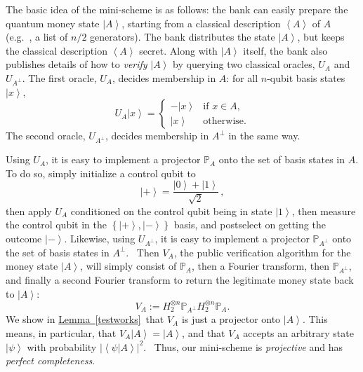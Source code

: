\documentclass[10pt]{article}
\theoremstyle{definition}
\providecommand{\eg}{e.g.\ }
\numberwithin{equation}{section}
\newcommand{\expref}[2]{\texorpdfstring{\hyperref[#2]{#1~\ref{#2}}}{#1~\ref{#2}}}
\begin{document}
The basic idea of the mini-scheme is as follows: the bank can easily prepare
the quantum money state $\left\vert A\right\rangle $, starting from a
classical description $\left\langle A\right\rangle $ of $A$ (\eg, a list of
$n/2$ generators). The bank distributes the state $\left\vert
A\right\rangle $, but keeps the classical description $\left\langle
A\right\rangle $ secret. Along with $\left\vert A\right\rangle $ itself,
the bank also publishes details of how to \emph{verify} $\left\vert
A\right\rangle $ by querying two classical oracles, $U_{A}$ and $U_{A^{\bot}%
}$. The first oracle, $U_{A}$, decides membership in $A$: for all $n$-qubit
basis states $\left\vert x\right\rangle $,%
\[
U_{A}\left\vert x\right\rangle =
\begin{cases}
-\left\vert x\right\rangle  & \text{if $x\in A$,}\\
\left\vert x\right\rangle  & \text{otherwise.}%
\end{cases}
\]
The second oracle, $U_{A^{\bot}}$, decides membership in $A^{\bot}$ in the
same way.

Using $U_{A}$, it is easy to implement a projector $\mathbb{P}_{A}$ onto the
set of basis states in $A$. To do so, simply initialize a control qubit to
\[
\left\vert +\right\rangle =\frac{\left\vert 0\right\rangle +\left\vert
1\right\rangle }{\sqrt{2}}\,,
\]
then apply $U_{A}$ conditioned on the control
qubit being in state $\left\vert 1\right\rangle $, then measure the control
qubit in the $\left\{  \left\vert +\right\rangle ,\left\vert -\right\rangle
\right\}  $ basis, and postselect on getting the outcome $\left\vert
-\right\rangle $. Likewise, using $U_{A^{\bot}}$, it is easy to implement a
projector $\mathbb{P}_{A^{\bot}}$ onto the set of basis states in $A^{\bot}$.
\ Then $V_{A}$, the public verification algorithm for the money state
$\left\vert A\right\rangle $, will simply consist of $\mathbb{P}_{A}$, then a
Fourier transform, then $\mathbb{P}_{A^{\bot}}$, and finally a second Fourier
transform to return the legitimate money state back to $\left\vert
A\right\rangle $:%
\[
V_{A}:=H_{2}^{\otimes n}\mathbb{P}_{A^{\bot}}H_{2}^{\otimes n}\mathbb{P}_{A}.
\]
We show in \expref{Lemma}{testworks}\ that $V_{A}$ is just a projector onto
$\left\vert A\right\rangle $. This means, in particular, that $V_{A}%
\left\vert A\right\rangle =\left\vert A\right\rangle $, and that $V_{A}%
$ accepts an arbitrary state $\left\vert \psi\right\rangle $ with
probability $\left\vert \left\langle \psi|A\right\rangle \right\vert ^{2}$.
\ Thus, our mini-scheme is \emph{projective} and has \emph{perfect
completeness}.
\end{document}
